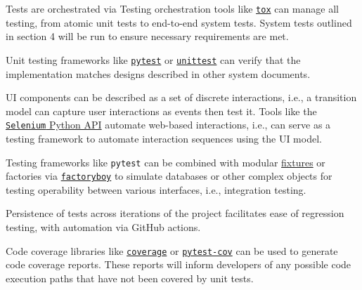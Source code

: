 \documentclass[12pt, titlepage]{article}
\begin{document}
\begin{description}[style=unboxed,leftmargin=0cm]
  \item[System Testing] Tests are orchestrated via Testing orchestration tools like \href{https://tox.wiki/}{\texttt{tox}} can manage all testing, from atomic unit tests to end-to-end system tests. System tests outlined in section 4 will be run to ensure necessary requirements are met.
  \item[Unit Testing] Unit testing frameworks like \href{https://docs.pytest.org/en/stable/}{\texttt{pytest}} or \href{https://docs.python.org/3/library/unittest}{\texttt{unittest}} can verify that the implementation matches designs described in other system documents.
  \item[User Interface Testing] UI components can be described as a set of discrete interactions, i.e., a transition model can capture user interactions as events then test it. Tools like the \href{https://selenium-python.readthedocs.io/}{\texttt{Selenium} Python API} automate web-based interactions, i.e., can serve as a testing framework to automate interaction sequences using the UI model.
  \item[Integration Testing] Testing frameworks like \texttt{pytest} can be combined with modular \href{https://docs.pytest.org/explanation/fixtures.html}{fixtures} or factories via \href{https://factoryboy.readthedocs.io/}{\texttt{factoryboy}} to simulate databases or other complex objects for testing operability between various interfaces, i.e., integration testing.
  \item[Regression Testing] Persistence of tests across iterations of the project facilitates ease of regression testing, with automation via GitHub actions.
  \item[Coverage Testing] Code coverage libraries like \href{https://coverage.readthedocs.io/en/7.6.4/}{\texttt{coverage}} or \href{https://pypi.org/project/pytest-cov/}{\texttt{pytest-cov}} can be used to generate code coverage reports. These reports will inform developers of any possible code execution paths that have not been covered by unit tests.
\end{description}
\end{document}
